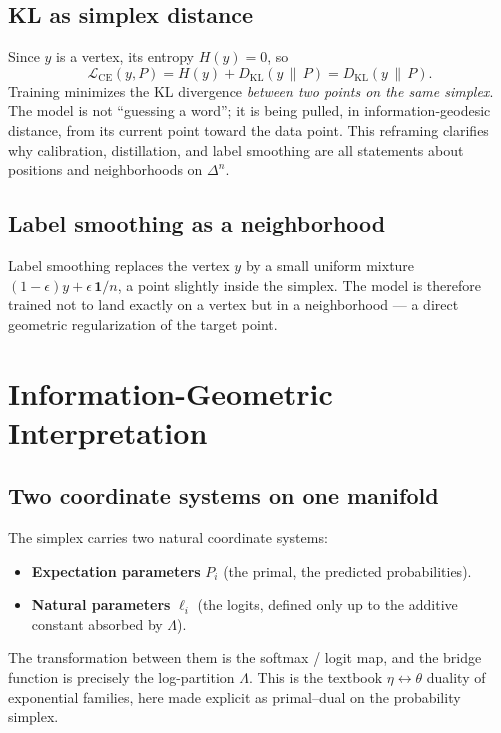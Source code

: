 \documentclass[11pt]{article}
\newcommand{\simplex}[1]{\Delta^{#1}}
\begin{document}
\subsection{KL as simplex distance}
\label{sec:kl-div}

Since $y$ is a vertex, its entropy $H(y)=0$, so
\[
\mathcal{L}_{\mathrm{CE}}(y,P)
= H(y) + D_{\mathrm{KL}}(y\,\|\,P)
= D_{\mathrm{KL}}(y\,\|\,P).
\]
Training minimizes the KL divergence \emph{between two points on the same
simplex}. The model is not ``guessing a word''; it is being pulled, in
information-geodesic distance, from its current point toward the data point.
This reframing clarifies why calibration, distillation, and label smoothing are
all statements about positions and neighborhoods on $\simplex{n}$.

\subsection{Label smoothing as a neighborhood}
\label{sec:kl-smooth}

Label smoothing replaces the vertex $y$ by a small uniform mixture
$(1-\epsilon)y + \epsilon\,\mathbf{1}/n$, a point slightly inside the simplex.
The model is therefore trained not to land exactly on a vertex but in a
neighborhood --- a direct geometric regularization of the target point.

\section{Information-Geometric Interpretation}
\label{sec:infogeo}

\subsection{Two coordinate systems on one manifold}
\label{sec:infogeo-two}

The simplex carries two natural coordinate systems:
\begin{itemize}
\item \textbf{Expectation parameters} $P_i$ (the primal, the predicted
probabilities).
\item \textbf{Natural parameters} $\ell_i$ (the logits, defined only up to the
additive constant absorbed by $\Lambda$).
\end{itemize}
The transformation between them is the softmax / logit map, and the bridge
function is precisely the log-partition $\Lambda$. This is the textbook
$\eta\leftrightarrow\theta$ duality of exponential families, here made explicit
as primal--dual on the probability simplex.
\end{document}
